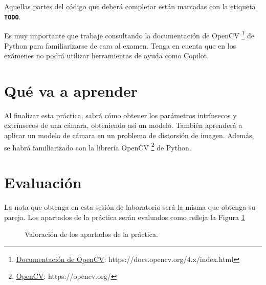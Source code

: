 Aquellas partes del código que deberá completar están marcadas con la etiqueta \textbf{\texttt{TODO}}.

Es muy importante que trabaje consultando la documentación de OpenCV \footnote{\href{https://docs.opencv.org/4.x/index.html}{Documentación de OpenCV}: https://docs.opencv.org/4.x/index.html} de Python para familiarizarse de cara al examen. Tenga en cuenta que en los exámenes no podrá utilizar herramientas de ayuda como Copilot.

\section{Qué va a aprender}

Al finalizar esta práctica, sabrá cómo obtener los parámetros intrínsecos y extrínsecos de una cámara, obteniendo así un modelo. También aprenderá a aplicar un modelo de cámara en un problema de distorsión de imagen. Además, se habrá familiarizado con la librería OpenCV \footnote{\href{https://opencv.org/}{OpenCV}: https://opencv.org/} de Python.

\section{Evaluación}
La nota que obtenga en esta sesión de laboratorio será la misma que obtenga su pareja. Los apartados de la práctica serán evaluados como refleja la Figura \ref{fig:evaluacion}

\begin{figure}[h]
    \centering
    \fbox{\rule{0pt}{150pt} \rule{200pt}{0pt}}
    \caption{Valoración de los apartados de la práctica.}
    \label{fig:evaluacion}
\end{figure}